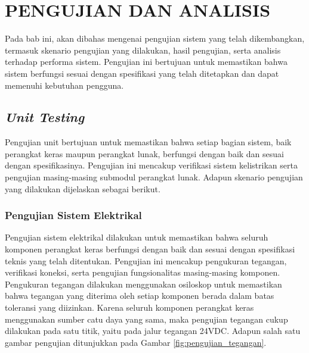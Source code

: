 

\chapter{PENGUJIAN DAN ANALISIS}
\label{chap:pengujiananalisis}

Pada bab ini, akan dibahas mengenai pengujian sistem yang telah dikembangkan,
termasuk skenario pengujian yang dilakukan, hasil pengujian, serta analisis
terhadap performa sistem. Pengujian ini bertujuan untuk memastikan bahwa sistem berfungsi
sesuai dengan spesifikasi yang telah ditetapkan dan dapat memenuhi kebutuhan pengguna.

\section{\emph{Unit Testing}}
Pengujian unit bertujuan untuk memastikan bahwa setiap bagian sistem, baik
perangkat keras maupun perangkat lunak, berfungsi dengan baik dan sesuai dengan spesifikasinya.
Pengujian ini mencakup verifikasi sistem kelistrikan serta pengujian masing-masing
submodul perangkat lunak. Adapun skenario pengujian yang dilakukan dijelaskan sebagai
berikut.

\subsection{Pengujian Sistem Elektrikal}
Pengujian sistem elektrikal dilakukan untuk memastikan bahwa seluruh komponen perangkat keras berfungsi dengan baik dan sesuai dengan spesifikasi teknis yang telah ditentukan. Pengujian ini mencakup pengukuran tegangan, verifikasi koneksi, serta pengujian fungsionalitas masing-masing komponen. Pengukuran tegangan dilakukan menggunakan osiloskop untuk memastikan bahwa tegangan yang diterima oleh setiap komponen berada dalam batas toleransi yang diizinkan. Karena seluruh komponen perangkat keras menggunakan sumber catu daya yang sama, maka pengujian tegangan cukup dilakukan pada satu titik, yaitu pada jalur tegangan 24VDC. Adapun salah satu gambar pengujian ditunjukkan pada Gambar \ref{fig:pengujian_tegangan}.


